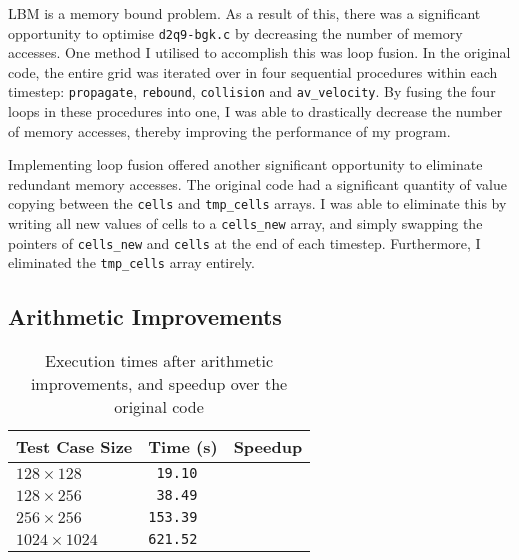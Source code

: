 \documentclass[11pt, twocolumn, a4paper]{article}
\begin{document}
LBM is a memory bound problem.
As a result of this, there was a significant opportunity to optimise \texttt{d2q9-bgk.c} by decreasing the number of memory accesses.
One method I utilised to accomplish this was loop fusion.
In the original code, the entire grid was iterated over in four sequential procedures within each timestep: \texttt{propagate}, \texttt{rebound}, \texttt{collision} and \texttt{av\_velocity}.
By fusing the four loops in these procedures into one, I was able to drastically decrease the number of memory accesses, thereby improving the performance of my program.

Implementing loop fusion offered another significant opportunity to eliminate redundant memory accesses.
The original code had a significant quantity of value copying between the \texttt{cells} and \texttt{tmp\_cells} arrays.
I was able to eliminate this by writing all new values of cells to a \texttt{cells\_new} array, and simply swapping the pointers of \texttt{cells\_new} and \texttt{cells} at the end of each timestep.
Furthermore, I eliminated the \texttt{tmp\_cells} array entirely.

\subsection{Arithmetic Improvements}

\begin{table}[htbp]
  \begin{center}
  \caption{Execution times after arithmetic improvements, and speedup over the original code}\label{tab:arithmetic_improvements}
  \begin{tabular}{l | l l} 
      \hline\hline
      Test Case Size&Time (s)&Speedup\\
      \hline
      $128 \times 128$&\texttt{ 19.10}&\texttt{}\\
      $128 \times 256$&\texttt{ 38.49}&\texttt{}\\
      $256 \times 256$&\texttt{153.39}&\texttt{}\\
      $1024 \times 1024$&\texttt{621.52}&\texttt{}\\
      \hline
    \end{tabular}
  \end{center}
\end{table} 
\end{document}
